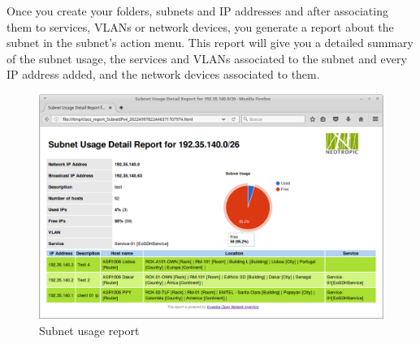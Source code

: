 \documentclass[a4paper]{article}
\begin{document}
		\newpage
		Once you create your folders, subnets and IP addresses and after associating them to services, VLANs or network devices, you generate a report about the subnet in the subnet's action menu. This report will give you a detailed summary of the subnet usage, the services and VLANs associated to the subnet and every IP address added, and the network devices associated to them.
		\begin{figure}[h!]
			\centering
			\includegraphics[width=1.1\linewidth]{img/ipam_report_subnet_usage_detail.png}
			\caption{Subnet usage report}
			\label{fig:ipam_report_subnet_usage_detail}
		\end{figure} 
		
		\newpage
\end{document}
